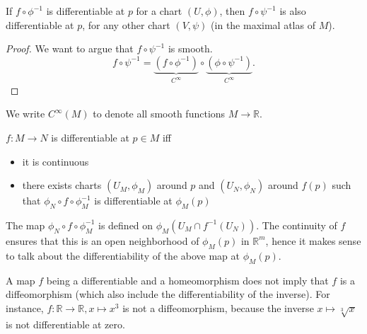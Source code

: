 \begin{remark}
    If $f \circ \phi^{-1}$ is differentiable at $p$ for a chart $(U, \phi)$, then $f \circ \psi^{-1}$ is also differentiable at $p$, for any other chart $(V,\psi)$ (in the maximal atlas of $M$).
\end{remark}
\begin{proof}
    We want to argue that $f \circ \psi^{-1}$ is smooth.
    \[
        f \circ \psi^{-1} = \underbrace{(f \circ \phi^{-1})}_{C^{\infty}} \circ \underbrace{(\phi \circ \psi^{-1})}_{C^{\infty}}
    .\] 
\end{proof}
\begin{notation}
    We write $C^{\infty}(M)$ to denote all smooth functions  $M \to  \mathbb R$.
\end{notation}
\begin{definition}

    $f: M \to  N$ is differentiable at $p \in M$ iff
    \begin{itemize}
        \item it is continuous
        \item there exists charts $(U_M,\phi_M)$ around $p$ and $(U_N,\phi_N)$  around $f(p)$ such that 
            $\phi_N \circ f \circ \phi_M^{-1}$ is differentiable at $\phi_M(p)$
    \end{itemize}

\end{definition}
\begin{remark} The map $\phi_N \circ f \circ \phi_M^{-1}$  is defined on 
$\phi_M(U_M\cap f^{-1}(U_N))$.
The continuity of $f$ ensures that this is an open neighborhood of $\phi_M(p)$ in $\mathbb{R}^m$, hence it makes sense to talk about the differentiability of the above map at 
$\phi_M(p)$.
\end{remark}



\begin{remark}
A map $f$ being a differentiable and a homeomorphism does not imply that $f$ is a diffeomorphism (which also include the differentiability of the inverse).
For instance, $f\colon \mathbb R\to \mathbb R, x\mapsto x^3$ is not a diffeomorphism, because the inverse $x\mapsto \sqrt[3]{x}$ is not differentiable at zero.
\end{remark}